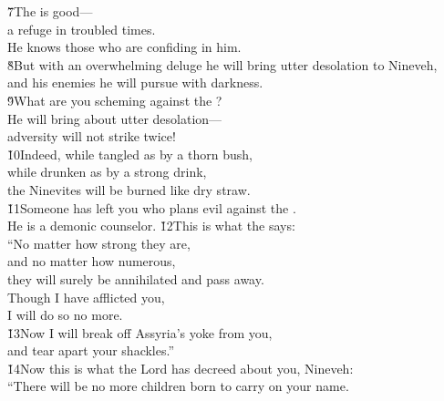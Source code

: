 \begin{poetry}
\poeml \v{7}The  is good--- \\
\poemll    a refuge in troubled times. \\
\poeml He knows those who are confiding in him. \\
\poeml \v{8}But with an overwhelming deluge he will bring utter desolation to Nineveh, \\
\poemll    and his enemies he will pursue with darkness. \\
\poeml \v{9}What are you scheming against the ? \\
\poemll    He will bring about utter desolation--- \\
\poemlll       adversity will not strike twice! \\
\poeml \v{10}Indeed, while tangled as by a thorn bush, \\
\poemll    while drunken as by a strong drink, \\
\poemlll       the Ninevites will be burned like dry straw. \\
\poeml \v{11}Someone has left you who plans evil against the . \\
\poemll    He is a demonic counselor.
\poeml \v{12}This is what the  says: \\
\poeml ``No matter how strong they are, \\
\poemll    and no matter how numerous, \\
\poemlll       they will surely be annihilated and pass away. \\
\poeml Though I have afflicted you, \\
\poemll    I will do so no more. \\
\poeml \v{13}Now I will break off Assyria's yoke from you, \\
\poemll    and tear apart your shackles.'' \\
\poeml \v{14}Now this is what the Lord has decreed about you, Nineveh: \\
\poemll    ``There will be no more children born to carry on your name. \\

\end{poetry}
